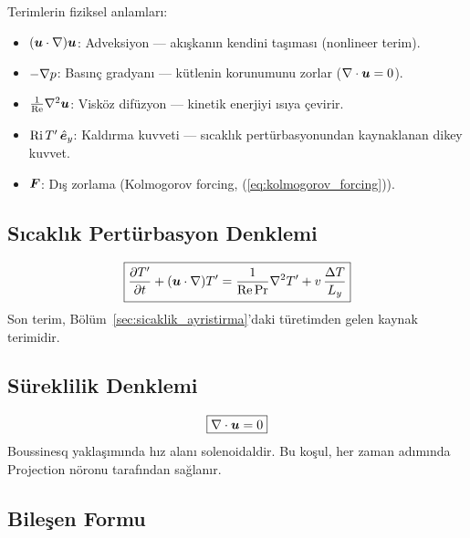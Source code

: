 Terimlerin fiziksel anlamları:
\begin{itemize}
    \item $(\bm{u} \cdot \nabla)\bm{u}$: Adveksiyon --- akışkanın kendini taşıması (nonlineer terim).
    \item $-\nabla p$: Basınç gradyanı --- kütlenin korunumunu zorlar ($\nabla \cdot \bm{u} = 0$).
    \item $\frac{1}{\mathrm{Re}} \nabla^2 \bm{u}$: Visköz difüzyon --- kinetik enerjiyi ısıya çevirir.
    \item $\mathrm{Ri} \, T' \, \hat{\bm{e}}_y$: Kaldırma kuvveti --- sıcaklık pertürbasyonundan kaynaklanan dikey kuvvet.
    \item $\bm{F}$: Dış zorlama (Kolmogorov forcing, (\ref{eq:kolmogorov_forcing})).
\end{itemize}

\subsection{Sıcaklık Pertürbasyon Denklemi}
\begin{equation}
    \boxed{
        \frac{\partial T'}{\partial t} + (\bm{u} \cdot \nabla)T'
        = \frac{1}{\mathrm{Re} \, \mathrm{Pr}} \nabla^2 T'
        + v \, \frac{\Delta T}{L_y}
    }
    \label{eq:temperature_bizim}
\end{equation}
Son terim, Bölüm~\ref{sec:sicaklik_ayristirma}'daki türetimden gelen kaynak terimidir.

\subsection{Süreklilik Denklemi}
\begin{equation}
    \boxed{\nabla \cdot \bm{u} = 0}
    \label{eq:continuity_bizim}
\end{equation}
Boussinesq yaklaşımında hız alanı solenoidaldir. Bu koşul, her zaman adımında Projection nöronu tarafından sağlanır.

\subsection{Bileşen Formu}

